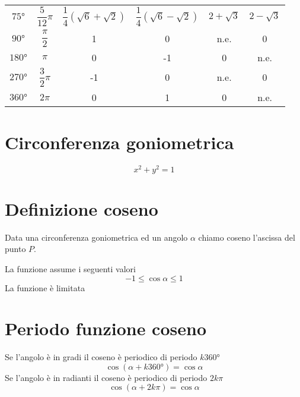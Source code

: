 \begin{center}
\begin{tabular}{cccccc}
		$\ang{75}$ &$\dfrac{5}{12}\pi$ &$\dfrac{1}{4}\left(\sqrt{6}+\sqrt{2}\right)$&$\dfrac{1}{4}\left(\sqrt{6}-\sqrt{2}\right)$&$2+\sqrt{3}$& $2-\sqrt{3}$ \\ [.25cm]
		$\ang{90}$&$\dfrac{\pi}{2}$&1&0&n.e.&0\\[.25cm]
		$\ang{180}$&$\pi$&0&-1& 0 &n.e.\\ [.25cm]
		$\ang{270}$&$\dfrac{3}{2}\pi$&-1&0&n.e.&0\\ [.25cm]
		$\ang{360}$&$2\pi$&0&1&0&n.e.\\ [.25cm]
		\bottomrule%
	\end{tabular}
\end{center}
\section{Circonferenza goniometrica}
\begin{equation*}
x^2+y^2=1
\end{equation*}
\section{Definizione coseno}
Data una circonferenza goniometrica ed un angolo $\alpha$ chiamo coseno l'ascissa del punto $P$.
\begin{center}
	
\end{center}
La funzione assume i seguenti valori
\begin{equation*}
-1\leq \cos\alpha \leq 1
\end{equation*}
La funzione è limitata
\section{Periodo funzione coseno}
Se l'angolo è in gradi il coseno è periodico di periodo $k\ang{360}$
\begin{equation*}
\cos(\alpha+k\ang{360;;})=\cos\alpha
\end{equation*}
Se l'angolo è in radianti il coseno è periodico di periodo $2k\pi$
\begin{equation*}
\cos(\alpha+2k\pi)=\cos\alpha
\end{equation*}
